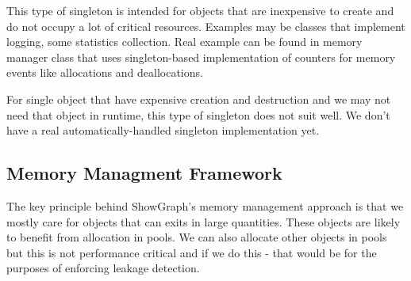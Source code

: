\documentclass[11pt,twoside,a4paper]{article}
\begin{document}
This type of singleton is intended for objects that are inexpensive to create and do not occupy a lot of critical resources. Examples may be classes that implement logging, some statistics collection. Real example can be found in memory manager class that uses singleton-based implementation of counters for memory events like allocations and deallocations.

For single object that have expensive creation and destruction and we may not need that object in runtime, this type of singleton does not suit well. We don't have a real automatically-handled singleton implementation yet.

\subsection{Memory Managment Framework}
The key principle behind ShowGraph's memory management approach is that we mostly care for objects that can exits in large quantities. These objects are likely to benefit from allocation in pools. We can also allocate other objects in pools but this is not performance critical and if we do this - that would be for the purposes of enforcing leakage detection.
\end{document}
